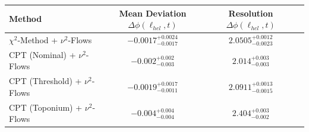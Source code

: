     \begin{tabular}{lccc}
        \toprule
        Method & Mean Deviation $\Delta\phi(\ell_{hel}, t)$ & Resolution $\Delta\phi(\ell_{hel}, t)$ \\
        \midrule
        $\chi^2$-Method + $\nu^2$-Flows & $-0.0017^{+0.0024}_{-0.0017}$ & $2.0505^{+0.0012}_{-0.0023}$ \\
        CPT (Nominal) + $\nu^2$-Flows & $-0.002^{+0.002}_{-0.003}$ & $2.014^{+0.003}_{-0.003}$ \\
        CPT (Threshold) + $\nu^2$-Flows & $-0.0019^{+0.0017}_{-0.0011}$ & $2.0911^{+0.0013}_{-0.0015}$ \\
        CPT (Toponium) + $\nu^2$-Flows & $-0.004^{+0.004}_{-0.004}$ & $2.404^{+0.003}_{-0.002}$ \\
        \bottomrule
    \end{tabular}